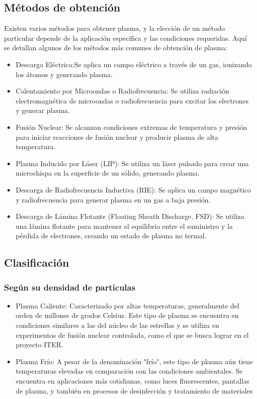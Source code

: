 \subsection{Métodos de obtención}
Existen varios métodos para obtener plasma, y la elección de un método particular depende de la aplicación específica y las condiciones requeridas. Aquí se detallan algunos de los métodos más comunes de obtención de plasma:
    \begin{itemize}
        \item Descarga Eléctrica:Se aplica un campo eléctrico a través de un gas, ionizando los átomos y generando plasma.
        \item Calentamiento por Microondas o Radiofrecuencia: Se utiliza radiación electromagnética de microondas o radiofrecuencia para excitar los electrones y generar plasma.
        \item Fusión Nuclear: Se alcanzan condiciones extremas de temperatura y presión para iniciar reacciones de fusión nuclear y producir plasma de alta temperatura.
        \item Plasma Inducido por Láser (LIP): Se utiliza un láser pulsado para crear una microchispa en la superficie de un sólido, generando plasma.
        \item Descarga de Radiofrecuencia Inductiva (RIE): Se aplica un campo magnético y radiofrecuencia para generar plasma en un gas a baja presión.
        \item Descarga de Lámina Flotante (Floating Sheath Discharge, FSD): Se utiliza una lámina flotante para mantener el equilibrio entre el suministro y la pérdida de electrones, creando un estado de plasma no termal.
    \end{itemize}
\subsection{Clasificación}
    \subsubsection{Según su densidad de particulas}
        \begin{itemize}
            \item Plasma Caliente: Caracterizado por altas temperaturas, generalmente del orden de millones de grados Celsius. Este tipo de plasma se encuentra en condiciones similares a las del núcleo de las estrellas y se utiliza en experimentos de fusión nuclear controlada, como el que se busca lograr en el proyecto ITER.
            \item Plasma Frío: A pesar de la denominación "frío", este tipo de plasma aún tiene temperaturas elevadas en comparación con las condiciones ambientales. Se encuentra en aplicaciones más cotidianas, como luces fluorescentes, pantallas de plasma, y también en procesos de desinfección y tratamiento de materiales
        \end{itemize}
